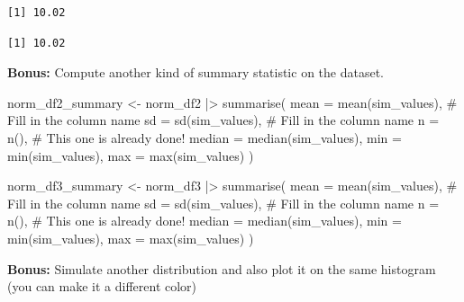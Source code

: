 \documentclass[
  letterpaper,
  DIV=11,
  numbers=noendperiod]{scrartcl}
\newenvironment{Shaded}{\begin{snugshade}}{\end{snugshade}}
\newcommand{\AttributeTok}[1]{\textcolor[rgb]{0.40,0.45,0.13}{#1}}
\newcommand{\CommentTok}[1]{\textcolor[rgb]{0.37,0.37,0.37}{#1}}
\newcommand{\DecValTok}[1]{\textcolor[rgb]{0.68,0.00,0.00}{#1}}
\newcommand{\FunctionTok}[1]{\textcolor[rgb]{0.28,0.35,0.67}{#1}}
\newcommand{\NormalTok}[1]{\textcolor[rgb]{0.00,0.23,0.31}{#1}}
\newcommand{\OtherTok}[1]{\textcolor[rgb]{0.00,0.23,0.31}{#1}}
\newcommand{\SpecialCharTok}[1]{\textcolor[rgb]{0.37,0.37,0.37}{#1}}
\begin{document}
\begin{verbatim}
[1] 10.02
\end{verbatim}

\begin{Shaded}
\end{Shaded}

\begin{verbatim}
[1] 10.02
\end{verbatim}

\textbf{Bonus:} Compute another kind of summary statistic on the
dataset.

\begin{Shaded}
\begin{Highlighting}[]
\NormalTok{norm\_df2\_summary }\OtherTok{\textless{}{-}}\NormalTok{ norm\_df2 }\SpecialCharTok{|\textgreater{}} 
  \FunctionTok{summarise}\NormalTok{(}
    \AttributeTok{mean =} \FunctionTok{mean}\NormalTok{(sim\_values),  }\CommentTok{\# Fill in the column name}
    \AttributeTok{sd =} \FunctionTok{sd}\NormalTok{(sim\_values),      }\CommentTok{\# Fill in the column name }
    \AttributeTok{n =} \FunctionTok{n}\NormalTok{(),            }\CommentTok{\# This one is already done!}
    \AttributeTok{median =} \FunctionTok{median}\NormalTok{(sim\_values),}
    \AttributeTok{min =} \FunctionTok{min}\NormalTok{(sim\_values),}
    \AttributeTok{max =} \FunctionTok{max}\NormalTok{(sim\_values)}
\NormalTok{  )}

\NormalTok{norm\_df3\_summary }\OtherTok{\textless{}{-}}\NormalTok{ norm\_df3 }\SpecialCharTok{|\textgreater{}}
  \FunctionTok{summarise}\NormalTok{(}
    \AttributeTok{mean =} \FunctionTok{mean}\NormalTok{(sim\_values),  }\CommentTok{\# Fill in the column name}
    \AttributeTok{sd =} \FunctionTok{sd}\NormalTok{(sim\_values),      }\CommentTok{\# Fill in the column name }
    \AttributeTok{n =} \FunctionTok{n}\NormalTok{(),            }\CommentTok{\# This one is already done!}
    \AttributeTok{median =} \FunctionTok{median}\NormalTok{(sim\_values),}
    \AttributeTok{min =} \FunctionTok{min}\NormalTok{(sim\_values),}
    \AttributeTok{max =} \FunctionTok{max}\NormalTok{(sim\_values)}
\NormalTok{  )}
\end{Highlighting}
\end{Shaded}

\textbf{Bonus:} Simulate another distribution and also plot it on the
same histogram (you can make it a different color)
\end{document}
